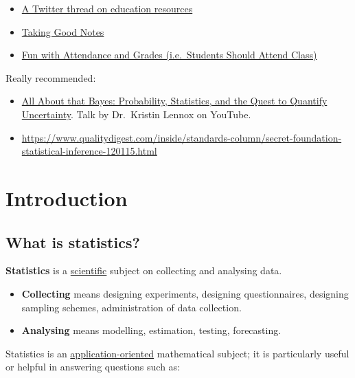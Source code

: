 \documentclass[
]{book}
\providecommand{\tightlist}{%
  \setlength{\itemsep}{0pt}\setlength{\parskip}{0pt}}
\theoremstyle{definition}
\theoremstyle{definition}
\theoremstyle{definition}
\theoremstyle{definition}
\theoremstyle{remark}
\begin{document}
\begin{itemize}
\tightlist
\item
  \href{https://twitter.com/danialAhamdani/status/1332679355756003332}{A Twitter thread on education resources}
\item
  \href{http://svmiller.com/blog/2014/09/taking-good-notes/}{Taking Good Notes}
\item
  \href{http://svmiller.com/blog/2016/05/fun-with-attendance-grades/}{Fun with Attendance and Grades (i.e.~Students Should Attend Class)}
\end{itemize}

Really recommended:

\begin{itemize}
\item
  \href{https://youtu.be/eDMGDhyDxuY}{All About that Bayes: Probability, Statistics, and the Quest to Quantify Uncertainty}. Talk by Dr.~Kristin Lennox on YouTube.
\item
  \url{https://www.qualitydigest.com/inside/standards-column/secret-foundation-statistical-inference-120115.html}
\end{itemize}

\hypertarget{part-introduction}{%
\part{Introduction}\label{part-introduction}}

\hypertarget{what-is-statistics}{%
\chapter*{What is statistics?}\label{what-is-statistics}}

\textbf{Statistics} is a \uline{scientific} subject on
collecting and analysing data.

\begin{itemize}
\tightlist
\item
  \textbf{Collecting} means designing experiments, designing
  questionnaires, designing sampling schemes, administration of data
  collection.
\item
  \textbf{Analysing} means modelling, estimation, testing, forecasting.
\end{itemize}

Statistics is an \uline{application-oriented} mathematical subject; it is
particularly useful or helpful in answering questions such as:
\end{document}
